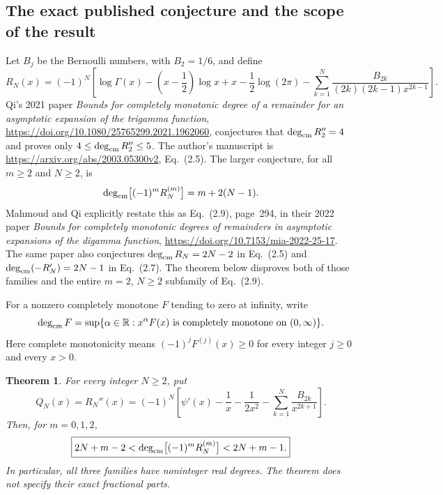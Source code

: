 \documentclass[11pt,a4paper]{article}
\newtheorem{theorem}{Theorem}[section]
\theoremstyle{definition}
\theoremstyle{remark}
\numberwithin{equation}{section}
\begin{document}
\subsection{The exact published conjecture and the scope of the result}
Let $B_j$ be the Bernoulli numbers, with $B_2=1/6$, and define
\[
 R_N(x)=(-1)^N\left[\log\Gamma(x)-\left(x-\frac12\right)\log x+x
 -\frac12\log(2\pi)
 -\sum_{k=1}^N\frac{B_{2k}}{(2k)(2k-1)x^{2k-1}}\right].
\]
Qi's 2021 paper \emph{Bounds for completely monotonic degree of a remainder
for an asymptotic expansion of the trigamma function},
\url{https://doi.org/10.1080/25765299.2021.1962060}, conjectures that
$\deg_{\rm cm}R_2''=4$ and proves only $4\leq\deg_{\rm cm}R_2''\leq5$.
The author's manuscript is \url{https://arxiv.org/abs/2003.05300v2},
Eq.~(2.5). The larger conjecture, for all $m\geq2$ and $N\geq2$, is
\[
 \deg_{\rm cm}\bigl[(-1)^mR_N^{(m)}\bigr]=m+2(N-1).
\]
Mahmoud and Qi explicitly restate this as Eq.~(2.9), page~294, in their
2022 paper \emph{Bounds for completely monotonic degrees of remainders in
asymptotic expansions of the digamma function},
\url{https://doi.org/10.7153/mia-2022-25-17}.
The same paper also conjectures $\deg_{\rm cm}R_N=2N-2$ in
Eq.~(2.5) and $\deg_{\rm cm}(-R_N')=2N-1$ in Eq.~(2.7).
The theorem below disproves both of those families and the entire
$m=2$, $N\geq2$ subfamily of Eq.~(2.9).

For a nonzero completely monotone $F$ tending to zero at infinity, write
\[
 \deg_{\rm cm}F=\sup\{\alpha\in\mathbb R:x^\alpha F(x)
                 \text{ is completely monotone on }(0,\infty)\}.
\]
Here complete monotonicity means $(-1)^jF^{(j)}(x)\geq0$ for every
integer $j\geq0$ and every $x>0$.

\begin{theorem}\label{p8:frontier:strip}
For every integer $N\geq2$, put
\[
 Q_N(x)=R_N''(x)
 =(-1)^N\left[\psi'(x)-\frac1x-\frac1{2x^2}
                  -\sum_{k=1}^N\frac{B_{2k}}{x^{2k+1}}\right].
\]
Then, for $m=0,1,2$,
\[
 \boxed{2N+m-2<\deg_{\rm cm}\bigl[(-1)^mR_N^{(m)}\bigr]
                      <2N+m-1.}
\]
In particular, all three families have noninteger real degrees. The
theorem does not specify their exact fractional parts.
\end{theorem}
\end{document}
